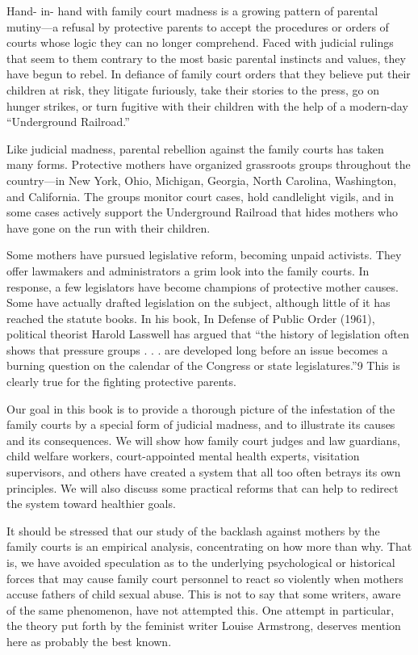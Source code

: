 Hand- in- hand with family court madness is a growing pattern of parental mutiny—a refusal by protective parents to accept the procedures or orders of courts whose logic they can no longer comprehend. Faced with judicial rulings that seem to them contrary to the most basic parental instincts and values, they have begun to rebel. In defiance of family court orders that they believe put their children at risk, they litigate furiously, take their stories to the press, go on hunger strikes, or turn fugitive with their children with the help of a modern-day “Underground Railroad.” \pfl{}


Like judicial madness, parental rebellion against the family courts has taken many forms. Protective mothers have organized grassroots groups throughout the country—in New York, Ohio, Michigan, Georgia, North Carolina, Washington, and California. The groups monitor court cases, hold candlelight vigils, and in some cases actively support the Underground Railroad that hides mothers who have gone on the run with their children. \pfl{}


Some mothers have pursued legislative reform, becoming unpaid activists. They offer lawmakers and administrators a grim look into the family courts. In response, a few legislators have become champions of protective mother causes. Some have actually drafted legislation on the subject, although little of it has reached the statute books. In his book, In Defense of Public Order (1961), political theorist Harold Lasswell has argued that “the history of legislation often shows that pressure groups . . . are developed long before an issue becomes a burning question on the calendar of the Congress or state legislatures.”9 This is clearly true for the fighting protective parents. \pfl{}


Our goal in this book is to provide a thorough picture of the infestation of the family courts by a special form of judicial madness, and to illustrate its causes and its consequences. We will show how family court judges and law guardians, child welfare workers, court-appointed mental health experts, visitation supervisors, and others have created a system that all too often betrays its own principles. We will also discuss some practical reforms that can help to redirect the system toward healthier goals. \pfl{}


It should be stressed that our study of the backlash against mothers by the family courts is an empirical analysis, concentrating on how more than why. That is, we have avoided speculation as to the underlying psychological or historical forces that may cause family court personnel to react so violently when mothers accuse fathers of child sexual abuse. This is not to say that some writers, aware of the same phenomenon, have not attempted this. One attempt in particular, the theory put forth by the feminist writer Louise Armstrong, deserves mention here as probably the best known. \pfl{}


